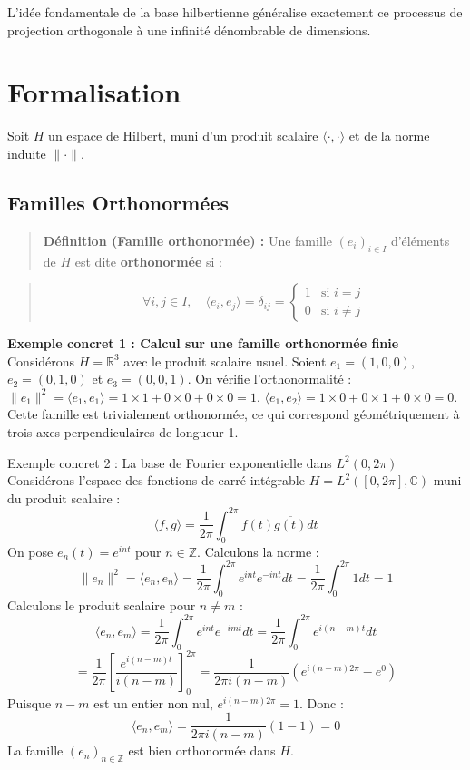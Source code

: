 \documentclass[11pt,a4paper]{article}
\begin{document}
L'idée fondamentale de la base hilbertienne généralise exactement ce processus de projection orthogonale à une infinité dénombrable de dimensions.

\section{Formalisation}

Soit $H$ un espace de Hilbert, muni d'un produit scalaire $\langle \cdot, \cdot \rangle$ et de la norme induite $\| \cdot \|$.

\subsection{Familles Orthonormées}

\begin{quote}\textbf{Définition (Famille orthonormée) :} Une famille $(e_i)_{i \in I}$ d'éléments de $H$ est dite \textbf{orthonormée} si :\end{quote}
\begin{quote}$$\forall i, j \in I, \quad \langle e_i, e_j \rangle = \delta_{ij} = \begin{cases} 1 & \text{si } i=j \\ 0 & \text{si } i \neq j \end{cases}$$\end{quote}

\textbf{Exemple concret 1 : Calcul sur une famille orthonormée finie}
Considérons $H = \mathbb{R}^3$ avec le produit scalaire usuel.
Soient $e_1 = (1, 0, 0)$, $e_2 = (0, 1, 0)$ et $e_3 = (0, 0, 1)$.
On vérifie l'orthonormalité :
$\|e_1\|^2 = \langle e_1, e_1 \rangle = 1 \times 1 + 0 \times 0 + 0 \times 0 = 1$.
$\langle e_1, e_2 \rangle = 1 \times 0 + 0 \times 1 + 0 \times 0 = 0$.
Cette famille est trivialement orthonormée, ce qui correspond géométriquement à trois axes perpendiculaires de longueur 1.

\textit{}Exemple concret 2 : La base de Fourier exponentielle dans $L^2(0, 2\pi)$\textit{}
Considérons l'espace des fonctions de carré intégrable $H = L^2([0, 2\pi], \mathbb{C})$ muni du produit scalaire :
$$ \langle f, g \rangle = \frac{1}{2\pi} \int_{0}^{2\pi} f(t) \overline{g(t)} dt $$
On pose $e_n(t) = e^{int}$ pour $n \in \mathbb{Z}$.
Calculons la norme :
$$ \|e_n\|^2 = \langle e_n, e_n \rangle = \frac{1}{2\pi} \int_{0}^{2\pi} e^{int} e^{-int} dt = \frac{1}{2\pi} \int_{0}^{2\pi} 1 dt = 1 $$
Calculons le produit scalaire pour $n \neq m$ :
$$ \langle e_n, e_m \rangle = \frac{1}{2\pi} \int_{0}^{2\pi} e^{int} e^{-imt} dt = \frac{1}{2\pi} \int_{0}^{2\pi} e^{i(n-m)t} dt $$
$$ = \frac{1}{2\pi} \left[ \frac{e^{i(n-m)t}}{i(n-m)} \right]_0^{2\pi} = \frac{1}{2\pi i (n-m)} (e^{i(n-m)2\pi} - e^0) $$
Puisque $n-m$ est un entier non nul, $e^{i(n-m)2\pi} = 1$. Donc :
$$ \langle e_n, e_m \rangle = \frac{1}{2\pi i (n-m)} (1 - 1) = 0 $$
La famille $(e_n)_{n \in \mathbb{Z}}$ est bien orthonormée dans $H$.
\end{document}
